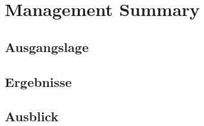 \begin{comment}
2.1.3 Management Summary und Web-Publikation
Das Management Summary soll 2-5 Seiten umfassen sowie eine bis zwei Figuren enthalten. Es richtet sich an den „gebildete Laien“ auf dem Gebiet und beschreibt daher in erster Linie die (neuen und eigenen) Ergebnisse und Resultate der Arbeit. Die Sprache soll knapp, klar und stark untergliedert sein.
Grundlage für das Management Summary kann der Broschüren-Eintrag sein, den die Abteilung bei Diplomarbeiten jeweils früh verlangt, um eine Broschüre zu drucken. Das Management Summary dient als Vorlage für eine allfällige Web-Publikation.
Das Abstract und das Management Summary werden - zeitlich gesehen - gegen Schluss der Arbeit geschrieben und bilden zusammen mit den Schlussfolgerungen im technischen Bericht den am häufigsten gelesenen Teil der Arbeit. Diese Dokumente sollen daher am Sorgfältigsten ausgearbeitet sein.
Die folgenden Stichworte sollen die typische Struktur illustrieren, wobei die genaue Ausführung jeweils auf die spezifischen Bedürfnisse und Randbedingungen eines Projekts anzupassen ist. Diese Struktur kann auch für die Präsentation der Arbeit als "Richtschnur" dienen.
1. Ausgangslage
Warum machen wir das Projekt?
Welche Ziele wurden gesteckt (Kann-Ziele, Muss-Ziele)
Was machen andere / welche ähnlichen Arbeiten gibt es zum Thema?
Vorgehen: Was wurde gemacht? In welchen Teilschritten?
Risiken der Arbeit?
Wer war involviert (Durchführung, Entscheide usw.)?
Was konnte von anderen verwendet werden?
2. Ergebnisse
Was ist das Resultat?
Bewertung der Resultate, was ist Neuartig an der Arbeit?
Zielerreichung bezüglich Kann-/Muss-Zielen
Abweichungen (positiv und negativ) und kurze Begründung dafür
(Externe) Kosten der Arbeit?
Was ist der Nutzen (quantifizierbar/nicht quantifizierbar)?
3. Ausblick
Was hat man mit Durchführung des Projekts gelernt?
Verbleibende Probleme, (zukünftige) Gegenmassnahmen bez. Risiken
Was würde man anders machen, was ist weiter zu tun

Überschriften (Unterkapitel) ohne Nummerierung einsetzen!
\end{comment}


{}

\chapter*{Management Summary}
\glsresetall


\section*{Ausgangslage}


\section*{Ergebnisse}


\section*{Ausblick}


